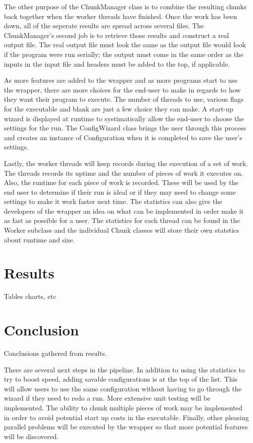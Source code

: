 \documentclass[12pt]{article}
\begin{document}
The other purpose of the ChunkManager class is to combine the resulting chunks 
back together when the worker threads have finished. Once the work has been
down, all of the seperate results are spread across several files. The
ChunkManager's second job is to retrieve those results and construct a real
output file. The real output file must look the same as the output file would
look if the program were run serially; the output must come in the same order as
the inputs in the input file and headers must be added to the top, if
applicable.

As more features are added to the wrapper and as more programs start to use the
wrapper, there are more choices for the end-user to make in regards to how they
want their program to execute. The number of threads to use, various flags for
the executable and blank are just a few choice they can make. A start-up wizard
is displayed at runtime to systimatically allow the end-user to choose the
settings for the run. The ConfigWizard class brings the user through this
process and creates an instance of Configuration when it is completed to save
the user's settings.

Lastly, the worker threads will keep records during the execution of a set of 
work. The threads records its uptime and the number of pieces of work it
executes on. Also, the runtime for each piece of work is recorded. These will be
used by the end user to determine if their run is ideal or if they may need to
change some settings to make it work faster next time. The statistics can also
give the developers of the wrapper an idea on what can be implemented in order
make it as fast as possible for a user. The statistics for each thread can be
found in the Worker subclass and the individual Chunk classes will store their
own statstics about runtime and size.

\section{Results}

Tables charts, etc

\section{Conclusion}

Conclusions gathered from results.

There are several next steps in the pipeline. In addition to using the
statistics to try to boost speed, adding savable configurations is at the top of
the list. This will allow users to use the same configuration without having to
go through the wizard if they need to redo a run. More extensive unit testing
will be implemented. The ability to chunk multiple pieces of work may be
implemented in order to avoid potential start up costs in the executable. 
Finally, other pleasing parallel problems will be executed by the wrapper so 
that more potential features will be discovered. 
\end{document}
